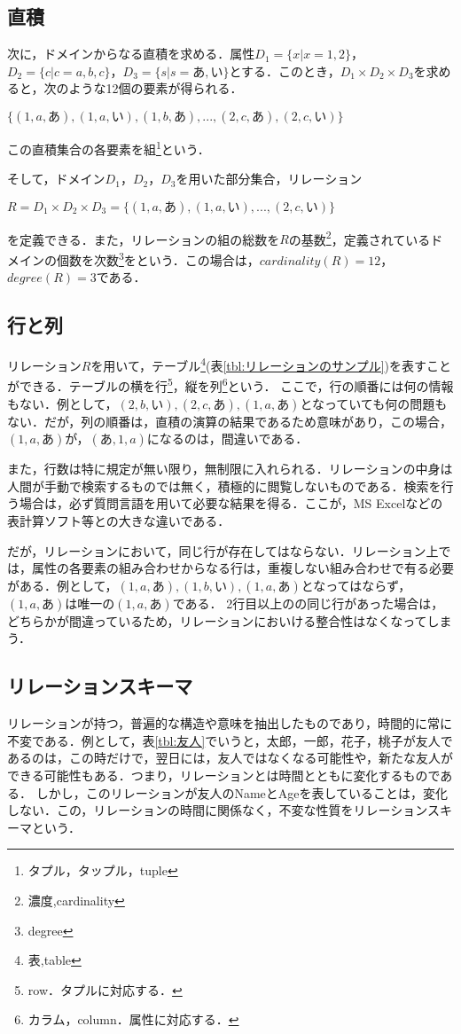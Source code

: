 \documentclass[a4paper,10pt]{jreport}
\begin{document}
\subsection{直積}
\par 次に，ドメインからなる直積を求める．属性$D_1=\{x|x=1,2\}$，$D_2=\{c|c=a,b,c\}$，$D_3=\{s|s=あ,い\}$とする．このとき，$D_1 \times D_2 \times D_3$を求めると，次のような12個の要素が得られる．
\begin{center}
	$\{(1,a,あ),(1,a,い),(1,b,あ),...,(2,c,あ),(2,c,い)\}$
\end{center}
この直積集合の各要素を組\footnote{タプル，タップル，tuple}という．
\par そして，ドメイン$D_1$，$D_2$，$D_3$を用いた部分集合，リレーション
\begin{center}
	$R=D_1 \times D_2 \times D_3=\{(1,a,あ),(1,a,い),...,(2,c,い)\}$
\end{center}
を定義できる．また，リレーションの組の総数を$R$の基数\footnote{濃度,cardinality}，定義されているドメインの個数を次数\footnote{degree}をという．この場合は，$cardinality(R)=12$，$degree(R)=3$である．

\subsection{行と列}
リレーション$R$を用いて，テーブル\footnote{表,table}(表\ref{tbl:リレーションのサンプル})を表すことができる．テーブルの横を行\footnote{row．タプルに対応する．}，縦を列\footnote{カラム，column．属性に対応する．}という．
ここで，行の順番には何の情報もない．例として，$(2,b,い),(2,c,あ),(1,a,あ)$となっていても何の問題もない．だが，列の順番は，直積の演算の結果であるため意味があり，この場合，$(1,a,あ)$が，$(あ,1,a)$になるのは，間違いである．
\par また，行数は特に規定が無い限り，無制限に入れられる．リレーションの中身は人間が手動で検索するものでは無く，積極的に閲覧しないものである．検索を行う場合は，必ず質問言語を用いて必要な結果を得る．ここが，MS Excelなどの表計算ソフト等との大きな違いである．
\par だが，リレーションにおいて，同じ行が存在してはならない．リレーション上では，属性の各要素の組み合わせからなる行は，重複しない組み合わせで有る必要がある．例として，$(1,a,あ),(1,b,い),(1,a,あ)$となってはならず，$(1,a,あ)$は唯一の$(1,a,あ)$である．
2行目以上のの同じ行があった場合は，どちらかが間違っているため，リレーションにおいける整合性はなくなってしまう．

\subsection{リレーションスキーマ}
リレーションが持つ，普遍的な構造や意味を抽出したものであり，時間的に常に不変である．例として，表\ref{tbl:友人}でいうと，太郎，一郎，花子，桃子が友人であるのは，この時だけで，翌日には，友人ではなくなる可能性や，新たな友人ができる可能性もある．つまり，リレーションとは時間とともに変化するものである．
しかし，このリレーションが友人のNameとAgeを表していることは，変化しない．この，リレーションの時間に関係なく，不変な性質をリレーションスキーマという．



\end{document}
